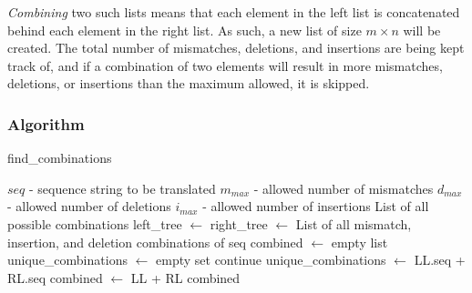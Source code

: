 \documentclass[12pt]{article}
\theoremstyle{definition}
\newcommand*\Let[2]{\State #1 $\gets$ #2}
\newcommand*\Returns[1]{\State \Return #1}
\begin{document}
\emph{Combining} two such lists means that each element in the left list is concatenated behind each element in the right list. As such, a new list of size $m \times n$ will be created. The total number of mismatches, deletions, and insertions are being kept track of, and if a combination of two elements will result in more mismatches, deletions, or insertions than the maximum allowed, it is skipped.

\subsubsection{Algorithm}

\begin{spacing}{0.8}
\begin{algorithm}[H]
	\caption{find\_combinations}
	\label{alg:divideandconquer}
  	\begin{algorithmic}[1]
    		\Require
    			\Statex $seq$ - sequence string to be translated
    			\Statex $m_{max}$ - allowed number of mismatches
    			\Statex $d_{max}$ - allowed number of deletions
    			\Statex $i_{max}$ - allowed number of insertions
    		\Ensure
    			\Statex List of all possible combinations
		\Statex
    			\Let{left\_tree}{} \label{alg:divide:leftT}
    			\Let{right\_tree}{} \label{alg:divide:rightT}
    		\Else
    			\Returns{List of all mismatch, insertion, and deletion combinations of seq} \label{alg:divide:conquer}
    		\EndIf
    		\State
    		\Let{combined}{empty list}
    		\Let{unique\_combinations}{empty set}
    		 
    			 \label{alg:divide:inner} 
    				 \label{alg:divide:invariant1}
    					\State continue
    				\EndIf
    				 \label{alg:divide:invariant2}
    					\Let{unique\_combinations}{LL.seq + RL.seq}
    					\Let{combined}{LL + RL}
    				\EndIf
    			\EndFor
    		\EndFor
    		\Returns{combined}
    		\EndFunction
  	\end{algorithmic}
\end{algorithm}
\end{spacing}
\end{document}

